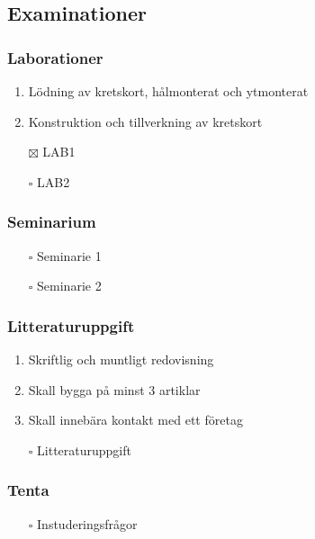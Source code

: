 \documentclass[11pt]{article}
\begin{document}
\subsection{Examinationer}
\label{sec:orgfe84ac7}
\subsubsection{Laborationer}
\label{sec:org9d71fa6}
\begin{enumerate}
\item Lödning av kretskort, hålmonterat och ytmonterat
\item Konstruktion och tillverkning av kretskort
\end{enumerate}


\begin{itemize}
\item[{$\boxtimes$}] LAB1
\item[{$\square$}] LAB2
\end{itemize}

\subsubsection{Seminarium}
\label{sec:org604ba5e}
\begin{itemize}
\item[{$\square$}] Seminarie 1
\item[{$\square$}] Seminarie 2
\end{itemize}

\subsubsection{Litteraturuppgift}
\label{sec:orgfaa0749}
\begin{enumerate}
\item Skriftlig och muntligt redovisning
\item Skall bygga på minst 3 artiklar
\item Skall innebära kontakt med ett företag
\end{enumerate}


\begin{itemize}
\item[{$\square$}] Litteraturuppgift
\end{itemize}


\subsubsection{Tenta}
\label{sec:org76bdd62}
\begin{itemize}
\item[{$\square$}] Instuderingsfrågor
\end{itemize}
\end{document}
